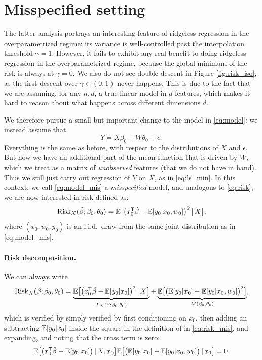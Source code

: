 \documentclass{article}
\begin{document}
\section{Misspecified setting}

The latter analysis portrays an interesting feature of ridgeless regression in  
the overparametrized regime: its variance is well-controlled past the
interpolation threshold $\gamma = 1$. However, it fails to exhibit any real
benefit to doing ridgeless regression in the overparametrized regime, because
the global minimum of the risk is always at $\gamma = 0$. We also do not see
double descent in Figure \ref{fig:risk_iso}, as the first descent over $\gamma
\in (0,1)$ never happens. This is due to the fact that we are assuming, for any 
$n,d$, a true linear model in $d$ features, which makes it hard to reason about
what happens across different dimensions $d$.    

We therefore pursue a small but important change to the model in
\eqref{eq:model}: we instead assume that    
\begin{equation}
\label{eq:model_mis}
Y = X\beta_0 + W\theta_0 + \epsilon,
\end{equation}
Everything is the same as before, with respect to the distributions of $X$ and
$\epsilon$. But now we have an additional part of the mean function that is
driven by $W$, which we treat as a matrix of \emph{unobserved} features (that we 
do not have in hand). Thus we still just carry out regression of $Y$ on $X$, as
in \eqref{eq:ls_min}. In this context, we call \eqref{eq:model_mis} a
\emph{misspecified} model, and analogous to \eqref{eq:risk}, we are now
interested in risk defined as:
\begin{equation}
\label{eq:risk_mis}
\mathrm{Risk}_X(\hat{\beta}; \beta_0, \theta_0) = \mathbb{E} \big[ \big( x_0^{\mathsf{T}} \hat{\beta} -
\mathbb{E}[y_0|x_0,w_0] \big)^2 \,\big|\, X \big],
\end{equation}
where $(x_0,w_0,y_0)$ is an i.i.d.\ draw from the same joint distribution as in 
\eqref{eq:model_mis}. 

\paragraph{Risk decomposition.} 

We can always write 
\begin{equation}
\label{eq:risk_mis_decomp}
\mathrm{Risk}_X(\hat{\beta}; \beta_0, \theta_0) = 
\underbrace{\mathbb{E} \big[ \big( x_0^{\mathsf{T}} \hat{\beta} - \mathbb{E}[y_0|x_0] \big)^2 \,|\, X 
  \big]}_{L_X(\hat{\beta}; \beta_0, \theta_0)} +
\underbrace{\mathbb{E} \big[ \big( \mathbb{E}[y_0|x_0] - \mathbb{E}[y_0|x_0,w_0] \big)^2
  \big]}_{M(\beta_0, \theta_0)}, 
\end{equation}
which is verified by simply verified by first conditioning on $x_0$, then adding
an subtracting $\mathbb{E}[y_0|x_0]$ inside the square in the definition of
 in \eqref{eq:risk_mis}, and expanding, 
and noting that the cross term is zero:   
\[
\mathbb{E} \big[ \big( x_0^{\mathsf{T}} \hat{\beta} - \mathbb{E}[y_0|x_0] \big) \,|\, X,x_0 \big]
\mathbb{E} \big[\big( \mathbb{E}[y_0|x_0] - \mathbb{E}[y_0|x_0,w_0] \big) \,|\, x_0 \big] = 0.
\]
\end{document}
